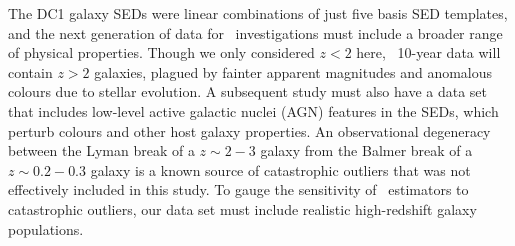 The DC1 galaxy SEDs were linear combinations of just five basis SED templates, and the next generation of data for \pzpdf\ investigations must include a broader range of physical properties.
Though we only considered $z < 2$ here, \lsst\ 10-year data will contain $z > 2$ galaxies, plagued by fainter apparent magnitudes and anomalous colours due to stellar evolution.
A subsequent study must also have a data set that includes low-level active galactic nuclei (AGN) features in the SEDs, which perturb colours and other host galaxy properties.
An observational degeneracy between the Lyman break of a $z \sim 2-3$ galaxy from the Balmer break of a $z \sim 0.2-0.3$ galaxy is a known source of catastrophic outliers \citep{massarotti_critical_2001} that was not effectively included in this study.
To gauge the sensitivity of \pzpdf\ estimators to catastrophic outliers, our data set must include realistic high-redshift galaxy populations.

%


